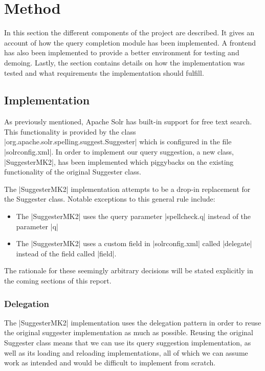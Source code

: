 \section{Method}\label{method}

In this section the different components of the project are described. It gives an account of how the query completion module has been implemented. A frontend has also been implemented to provide a better environment for testing and demoing. Lastly, the section contains details on how the implementation was tested and what requirements the implementation should fulfill. 

\subsection{Implementation}

As previously mentioned, Apache Solr has built-in support for free text search. This functionality is provided by the class |org.apache.solr.spelling.suggest.Suggester| which is configured in the file |solrconfig.xml|. In order to implement our query suggestion, a new class, |SuggesterMK2|, has been implemented which piggybacks on the existing functionality of the original Suggester class.\cite{SUGGESTER}

The |SuggesterMK2| implementation attempts to be a drop-in replacement for the Suggester class. Notable exceptions to this general rule include:
\begin{itemize}

\item The |SuggesterMK2| uses the query parameter |spellcheck.q| instead of the parameter |q|
\item The |SuggesterMK2| uses a custom field in |solrconfig.xml| called |delegate| instead of the field called |field|.
\end{itemize}

The rationale for these seemingly arbitrary decisions will be stated explicitly in the coming sections of this report.

\subsubsection{Delegation}

The |SuggesterMK2| implementation uses the delegation pattern\cite{DELEGATE} in order to reuse the original suggester implementation as much as possible. Reusing the original Suggester class means that we can use its query suggestion implementation, as well as its loading and reloading implementations, all of which we can assume work as intended and would be difficult to implement from scratch.

